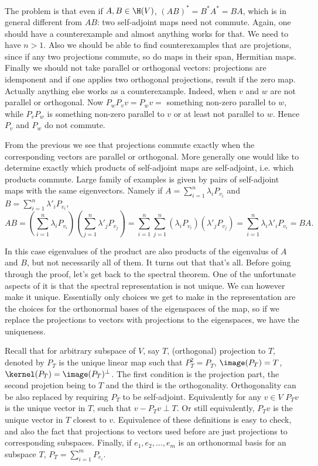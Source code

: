 The problem is that even if $A, B \in \H(V)$, $(AB)^{*} = B^{*} A^{*} = B A$, which is in general different from $A B$: two self-adjoint maps need not commute. Again, one should have a counterexample and almost anything works for that. We need to have $n > 1$. Also we should be able to find counterexamples that are projetions, since if any two projections commute, so do maps in their span, Hermitian maps. Finally we should not take parallel or orthogonal vectors: projections are idemponent and if one applies two orthogonal projections, result if the zero map. Actually anything else works as a counterexample. Indeed, when $v$ and $w$ are not parallel or orthogonal. Now $P_{w} P_{v} v = P_{w} v =$ something non-zero parallel to $w$, while $P_{v} P_{w}$ is something non-zero parallel to $v$ or at least not parallel to $w$. Hence $P_{v}$ and $P_{w}$ do not commute.

From the previous we see that projections commute exactly when the corresponding vectors are parallel or orthogonal. More generally one would like to determine exactly which products of self-adjoint maps are self-adjoint, i.e. which products commute. Large family of examples is given by pairs of self-adjoint maps with the same eigenvectors. Namely if $A = \sum_{i = 1}^{n} \lambda_{i} P_{v_{i}}$ and $B = \sum_{i = 1}^{n} \lambda'_{i} P_{v_{i}}$,
\[
	A B = \left(\sum_{i = 1}^{n} \lambda_{i} P_{v_{i}} \right) \left(\sum_{j = 1}^{n} \lambda'_{j} P_{v_{j}}\right) = \sum_{i = 1}^{n} \sum_{j = 1}^{n}\left(\lambda_{i} P_{v_{i}}\right)\left(\lambda'_{j} P_{v_{j}}\right) = \sum_{i = 1}^{n}\lambda_{i}\lambda'_{i} P_{v_{i}} = BA.
\]

In this case eigenvalues of the product are also products of the eigenvalus of $A$ and $B$, but not necessarily all of them. It turns out that that's all. Before going through the proof, let's get back to the spectral theorem. One of the unfortunate aspects of it is that the spectral representation is not unique. We can however make it unique. Essentially only choices we get to make in the representation are the choices for the orthonormal bases of the eigenspaces of the map, so if we replace the projections to vectors with projections to the eigenspaces, we have the uniqueness.

Recall that for arbitrary subspace of $V$, say $T$, (orthogonal) projection to $T$, denoted by $P_{T}$ is the unique linear map such that $P_{T}^2 = P_{T}$, $\image(P_{T}) = T$, $\kernel(P_{T}) = \image(P_{T})^{\perp}$. The first condition is the projection part, the second projetion being to $T$ and the third is the orthogonality. Orthogonality can be also replaced by requiring $P_{T}$ to be self-adjoint. Equivalently for any $v \in V$ $P_{T}v$ is the unique vector in $T$, such that $v - P_{T} v \perp T$. Or still equivalently, $P_{T} v$ is the unique vector in $T$ closest to $v$. Equivalence of these definitions is easy to check, and also the fact that projections to vectors used before are just projections to corresponding subspaces. Finally, if $e_{1}, e_{2}, \ldots, e_{m}$ is an orthonormal basis for an subspace $T$, $P_{T} = \sum_{i = 1}^{m} P_{e_{i}}$.

